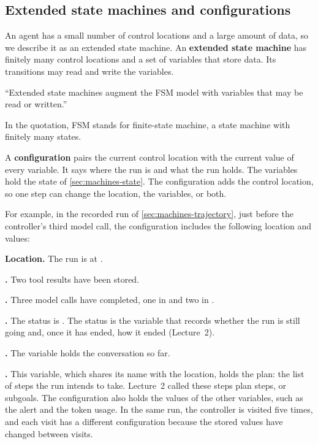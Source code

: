 \subsection{Extended state machines and configurations}
\label{sec:machines-configurations}

An agent has a small number of control locations and a large amount of data, so we describe it as an
extended state machine. An \textbf{extended state machine} has finitely many control locations and a
set of variables that store data. Its transitions may read and write the variables.

\begin{definition}
\label{def:machines-extended}
``Extended state machines augment the FSM model with variables that may be read or written.''
\citep[slide~4]{seshia2015extended}
\end{definition}

In the quotation, FSM stands for finite-state machine, a state machine with finitely many states.

A \textbf{configuration} pairs the current control location with the current value of every
variable. It says where the run is and what the run holds. The variables hold the state of
\cref{sec:machines-state}. The configuration adds the control location, so one step can change the
location, the variables, or both.

For example, in the recorded run of \cref{sec:machines-trajectory}, just before the controller's
third model call, the configuration includes the following location and values:
\bi
\item \textbf{Location.} The run is at .
\item \textbf{.} Two tool results have been stored.
\item \textbf{.} Three model calls have completed, one in  and two
in .
\item \textbf{.} The status is . The status is the variable that
records whether the run is still going and, once it has ended, how it ended (Lecture~2).
\item \textbf{.} The variable holds the conversation so far.
\item \textbf{.} This variable, which shares its name with the location, holds the
plan: the list of steps the run intends to take. Lecture~2 called these steps plan steps, or
subgoals.
\ei
The configuration also holds the values of the other variables, such as the alert and the token
usage. In the same run, the controller is visited five times, and each visit has a different configuration
because the stored values have changed between visits.

